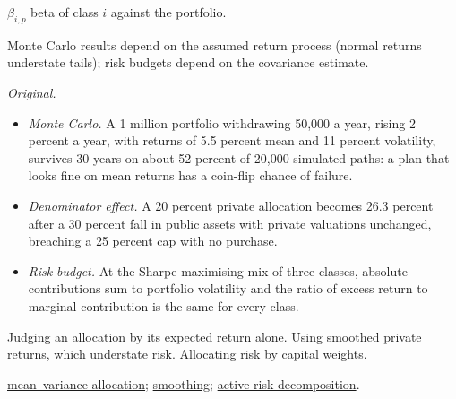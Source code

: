 \begin{qfmethod}
 $\beta_{i,p}$ beta of class $i$ against the portfolio.

 Monte Carlo results depend on the assumed return process (normal returns understate tails); risk budgets depend on the covariance estimate.

 \emph{Original.}
\begin{itemize}
\item \emph{Monte Carlo.} A 1 million portfolio withdrawing 50{,}000 a year, rising 2 percent a year, with returns of 5.5 percent mean and 11 percent volatility, survives 30 years on about 52 percent of 20{,}000 simulated paths: a plan that looks fine on mean returns has a coin-flip chance of failure.
\item \emph{Denominator effect.} A 20 percent private allocation becomes 26.3 percent after a 30 percent fall in public assets with private valuations unchanged, breaching a 25 percent cap with no purchase.
\item \emph{Risk budget.} At the Sharpe-maximising mix of three classes, absolute contributions sum to portfolio volatility and the ratio of excess return to marginal contribution is the same for every class.
\end{itemize}

 Judging an allocation by its expected return alone. Using smoothed private returns, which understate risk. Allocating risk by capital weights.

 \hyperref[meth:asset-only-allocation-mvo]{mean--variance allocation}; \hyperref[meth:cme-framework-forecasting]{smoothing}; \hyperref[meth:active-risk-decomposition]{active-risk decomposition}.

\end{qfmethod}

